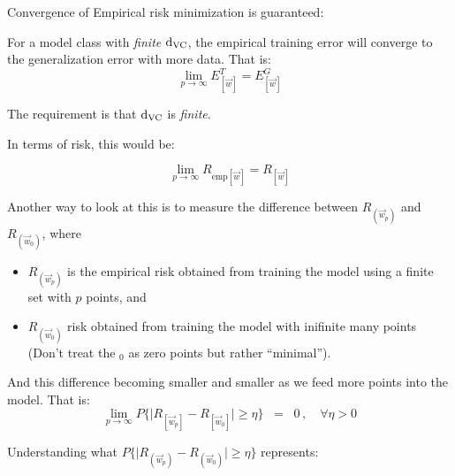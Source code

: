 \begin{frame}\frametitle{\subsecname}\label{sec:convergence_erm}
			
			Convergence of Empirical risk minimization is guaranteed:
			
			For a model class with \emph{finite} $\mathrm{d}_{\mathrm{VC}}$, the empirical training error will converge to the generalization error
			with more data. That is:
			\begin{equation}
				\lim_{p \to \infty}
						E^T_{[\vec w]} = E^G_{[\vec w]}
			\end{equation}
			
			The requirement is that $\mathrm{d}_{\mathrm{VC}}$ is \emph{finite}.
			
			In terms of risk, this would be:
			
			\begin{equation}
				\lim_{p \to \infty} 
					R_{\text{emp}[\vec w]} = R_{[\vec w]}
			\end{equation}
			
			Another way to look at this is to measure the difference between $R_{(\vec w_p)}$ and $R_{(\vec w_0)}$, where
			\begin{itemize}
			\item $R_{(\vec w_p)}$ is the empirical risk obtained from training the model using a finite set with $p$ points, and
			\item $R_{(\vec w_0)}$ risk obtained from training the model with inifinite many points (Don't treat the $_0$ as zero points but rather ``minimal'').
			\end{itemize}
			
			And this difference becoming smaller and smaller as we feed more points into the model. That is:
			\begin{equation}
				\lim_{p \to \infty} P\bigg\{ 
					{
						\Big|R_{[\vec w_p]} - R_{[\vec w_0]}\Big| 
					}
				\geq \eta \bigg\}\;\;=\;\; 0 \,, \quad \forall \eta > 0
			\end{equation}
			
			Understanding what $P\bigg\{ 
					{
						\Big|R_{(\vec w_p)} - R_{(\vec w_0)}\Big| 
					}
				\geq \eta \bigg\}$ represents:
			

\end{frame}
